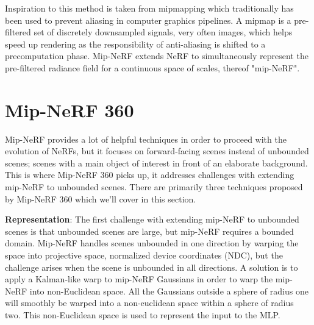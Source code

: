 Inspiration to this method is taken from mipmapping which traditionally has been used to prevent aliasing in computer graphics pipelines. A mipmap is a pre-filtered set of discretely downsampled signals, very often images, which helps speed up rendering as the responsibility of anti-aliasing is shifted to a precomputation phase. Mip-NeRF extends NeRF to simultaneously represent the pre-filtered radiance field for a continuous space of scales, thereof "mip-NeRF".




\section{Mip-NeRF 360} \label{sec:mipnerf360}

Mip-NeRF provides a lot of helpful techniques in order to proceed with the evolution of NeRFs, but it focuses on forward-facing scenes instead of unbounded scenes; scenes with a main object of interest in front of an elaborate background. This is where Mip-NeRF 360 picks up, it addresses challenges with extending mip-NeRF to unbounded scenes. There are primarily three techniques proposed by Mip-NeRF 360 which we'll cover in this section.

\textbf{Representation}:
The first challenge with extending mip-NeRF to unbounded scenes is that unbounded scenes are large, but mip-NeRF requires a bounded domain. Mip-NeRF handles scenes unbounded in one direction by warping the space into projective space, normalized device coordinates (NDC), but the challenge arises when the scene is unbounded in all directions. A solution is to apply a Kalman-like warp to mip-NeRF Gaussians in order to warp the mip-NeRF into non-Euclidean space. All the Gaussians outside a sphere of radius one will smoothly be warped into a non-euclidean space within a sphere of radius two. This non-Euclidean space is used to represent the input to the MLP. 



